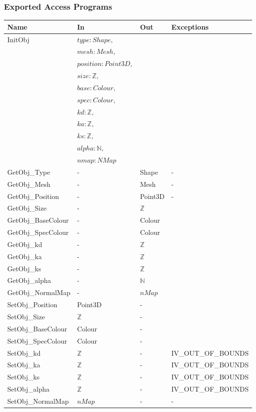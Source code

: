 \documentclass[12pt, titlepage]{article}
\begin{document}
\subsubsection{Exported Access Programs}
\begin{center}
\begin{tabular}{p{4cm} p{2cm} p{2cm} p{4cm}}
\hline
\textbf{Name} & \textbf{In} & \textbf{Out} & \textbf{Exceptions} \\
\hline

\multirow{11}{*}{InitObj} & $type: Shape,$ & & \\
& $ mesh: Mesh,$ & & \\
& $position : Point3D,$ & & \\
& $size : \mathbb{Z},$ & & \\  
& $base : Colour,$ & & \\
& $spec : Colour,$ & & \\
& $kd : \mathbb{Z},$ & & \\
& $ka : \mathbb{Z},$ & & \\
& $ks : \mathbb{Z},$ & & \\
& $alpha : \mathbb{N},$ & & \\
& $nmap : NMap $ & & \\
GetObj\_Type & - & Shape & - \\
GetObj\_Mesh & - & Mesh & - \\
GetObj\_Position & - & Point3D & - \\
GetObj\_Size &- & $\mathbb{Z}$ & \\
GetObj\_BaseColour &- & Colour & \\
GetObj\_SpecColour &- & Colour & \\
GetObj\_kd &- & $\mathbb{Z}$ & \\
GetObj\_ka &- & $\mathbb{Z}$& \\
GetObj\_ks &- & $\mathbb{Z}$ & \\
GetObj\_alpha &- & $\mathbb{N}$ & \\
GetObj\_NormalMap &- & $nMap$& \\ 
SetObj\_Position & Point3D & - & \\
SetObj\_Size & $\mathbb{Z}$ & - & \\
SetObj\_BaseColour & Colour &- & \\
SetObj\_SpecColour & Colour &- & \\
SetObj\_kd & $\mathbb{Z}$ &- & IV\_OUT\_OF\_BOUNDS\\
SetObj\_ka & $\mathbb{Z}$&- & IV\_OUT\_OF\_BOUNDS\\
SetObj\_ks & $\mathbb{Z}$ &- & IV\_OUT\_OF\_BOUNDS\\
SetObj\_alpha & $\mathbb{Z}$ &- & IV\_OUT\_OF\_BOUNDS\\
SetObj\_NormalMap & $nMap$ &- &- \\
\hline
\end{tabular}
\end{center}
\end{document}
